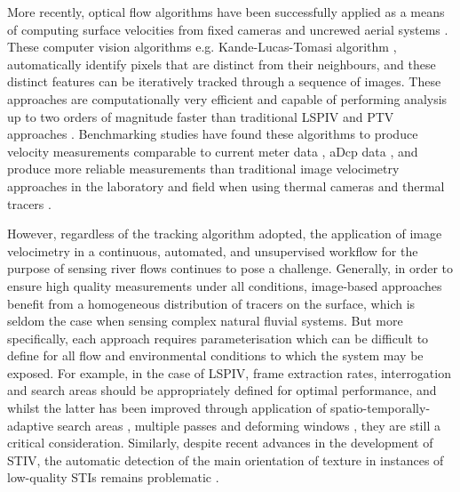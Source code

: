 \documentclass[hess, manuscript]{copernicus} %
\begin{document}
More recently, optical flow algorithms have been successfully applied as a means of computing surface velocities from fixed cameras \citep{Tauro2018b, Lin2019, Khalid2019} and uncrewed aerial systems \citep{Perks2016, eltner2020}. These computer vision algorithms e.g. Kande-Lucas-Tomasi algorithm \citep{Lucas1981, Tomasi1991, Shi1994}, automatically identify pixels that are distinct from their neighbours, and these distinct features can be iteratively tracked through a sequence of images. These approaches are computationally very efficient and capable of performing analysis up to two orders of magnitude faster than traditional LSPIV and PTV approaches \citep{Tauro2018b}. Benchmarking studies have found these algorithms to produce velocity measurements comparable to current meter data \citep{Tauro2018b}, aDcp data \citep{Pearce2020}, and produce more reliable measurements than traditional image velocimetry approaches in the laboratory and field when using thermal cameras and thermal tracers \citep{Lin2019}. 

However, regardless of the tracking algorithm adopted, the application of image velocimetry in a continuous, automated, and unsupervised workflow for the purpose of sensing river flows continues to pose a challenge. Generally, in order to ensure high quality measurements under all conditions, image-based approaches benefit from a homogeneous distribution of tracers on the surface, which is seldom the case when sensing complex natural fluvial systems. But more specifically, each approach requires parameterisation which can be difficult to define for all flow and environmental conditions to which the system may be exposed. For example, in the case of LSPIV, frame extraction rates, interrogation and search areas should be appropriately defined for optimal performance, and whilst the latter has been improved through application of spatio-temporally-adaptive search areas \citep{Fleit2019}, multiple passes and deforming windows \citep[e.g.,][]{Thielicke2021}, they are still a critical consideration. Similarly, despite recent advances in the development of STIV, the automatic detection of the main orientation of texture in instances of low-quality STIs remains problematic \citep{Wang2024}.
\end{document}
